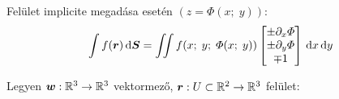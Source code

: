 \documentclass[main.tex]{subfiles}
\begin{document}



Felület implicite megadása esetén
$\left( z = \varPhi(x ;\; y) \right)$:
\begin{equation*}
  \int f(\rvec{r}) \, \differential \vsurf{S}
  =
  \iint f(x ;\; y ;\; \varPhi(x ;\; y))
  \begin{bmatrix}
    \pm \partial_x \varPhi \\
    \pm \partial_y \varPhi \\
    \mp 1
  \end{bmatrix}
  \, \differential x \, \differential y
\end{equation*}




Legyen $\boldsymbol{w}: \mathbb{R}^3 \rightarrow \mathbb{R}^3$ vektormező,
$\boldsymbol{r}: U \subset \mathbb{R}^2 \rightarrow \mathbb{R}^3$ felület:
\end{document}
